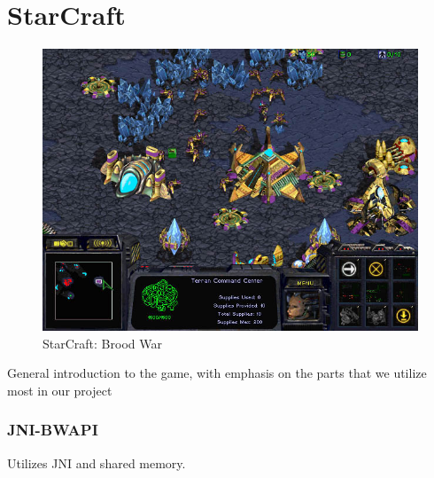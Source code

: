 
\section{StarCraft}
\label{sec:starcrafttheory}
\begin{figure}[h!tb]
\centering
\includegraphics[scale=0.5]{graphics/scbw.jpg}
\caption{StarCraft: Brood War}
\label{fig:scbwIntro}
\end{figure}

General introduction to the game, with emphasis on the parts that we utilize most in our project
\subsubsection{JNI-BWAPI}
Utilizes JNI and shared memory.
